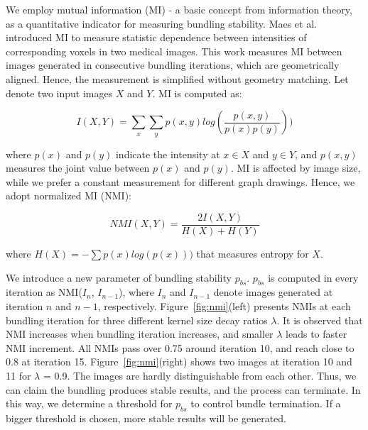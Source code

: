 We employ mutual information (MI) - a basic concept from information theory, as a quantitative indicator for measuring bundling stability.
Maes et al.~\cite{maes1997multimodality} introduced MI to measure statistic dependence between intensities of corresponding voxels in two medical images.
This work measures MI between images generated in consecutive bundling iterations, which are geometrically aligned.
Hence, the measurement is simplified without geometry matching. 
Let denote two input images $X$ and $Y$.
MI is computed as:

\vspace{-2mm} 
\begin{equation} \label{eq:mi}
I(X, Y) = \sum_{x}\sum_{y}p(x,y)log(\frac{p(x,y)}{p(x)p(y)}))
\end{equation}

\noindent
where $p(x)$ and $p(y)$ indicate the intensity at $x \in X$ and $y \in Y$, and $p(x, y)$ measures the joint value between $p(x)$ and $p(y)$.
MI is affected by image size, while we prefer a constant measurement for different graph drawings.
Hence, we adopt normalized MI (NMI):

\vspace{-2mm} 
\begin{equation}\label{eq:nmi}
NMI(X, Y) = \frac{2I(X,Y)}{H(X) + H(Y)} 
\end{equation}

\noindent
where $H(X) = -\sum p(x)log(p(x)))$ that measures entropy for $X$.

We introduce a new parameter of bundling stability $p_{bs}$.
$p_{bs}$ is computed in every iteration as NMI($I_n$, $I_{n-1}$), where $I_n$ and $I_{n-1}$ denote images generated at iteration $n$ and $n-1$, respectively.
Figure~\ref{fig:nmi}(left) presents NMIs at each bundling iteration for three different kernel size decay ratios $\lambda$.
It is observed that NMI increases when bundling iteration increases, and smaller $\lambda$ leads to faster NMI increment.
All NMIs pass over 0.75 around iteration 10, and reach close to 0.8 at iteration 15.
Figure~\ref{fig:nmi}(right) shows two images at iteration 10 and 11 for $\lambda$ = 0.9.
The images are hardly distinguishable from each other.
Thus, we can claim the bundling produces stable results, and the process can terminate.
In this way, we determine a threshold for $p_{bs}$ to control bundle termination.
If a bigger threshold is chosen, more stable results will be generated.

